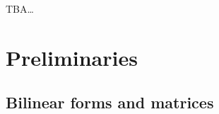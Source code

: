 \documentclass[12pt]{article}
\newcommand{\AZ}[1]{{\color{red}\textbf{AZ}:~#1}}
\begin{document}
TBA\dots


\section{Preliminaries}

\subsection{Bilinear forms and matrices}
\end{document}
